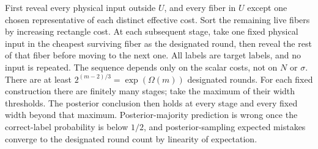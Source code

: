 First reveal every physical input outside $U$, and every fiber in $U$
except one chosen representative of each distinct effective cost.
Sort the remaining live fibers by increasing rectangle cost. At each subsequent stage, take one fixed
physical input in the cheapest surviving fiber as the designated round,
then reveal the rest of that fiber before moving to the next one.
All labels are target labels, and no input is repeated. The sequence
depends only on the scalar costs, not on $N$ or $\sigma$.
There are at least $2^{(m-2)/3}=\exp(\Omega(m))$ designated rounds.
For each fixed construction there are finitely many stages; take the
maximum of their width thresholds. The posterior conclusion then
holds at every stage and every fixed width beyond that maximum.
Posterior-majority prediction is wrong once the correct-label
probability is below $1/2$, and posterior-sampling expected mistakes
converge to the designated round count by linearity of expectation.
